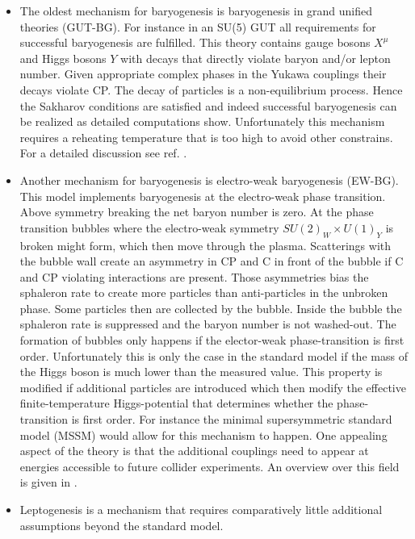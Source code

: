 \documentclass[13pt,a4paper,titlepage]{article}
\begin{document}
\begin{itemize}
    \item The oldest mechanism for baryogenesis is baryogenesis in grand unified theories (GUT-BG).
    For instance in an SU(5) GUT all requirements for successful baryogenesis are
    fulfilled. This theory contains gauge bosons $X^\mu$ and Higgs bosons $Y$ with decays that directly
    violate baryon and/or lepton number. Given appropriate complex phases in the Yukawa couplings
    their decays violate CP. The decay of particles is a non-equilibrium process. Hence the Sakharov conditions are satisfied and indeed successful baryogenesis can be realized as detailed computations show.
    Unfortunately this mechanism requires a reheating temperature that is too high to avoid other constrains. For a detailed discussion see ref. \cite[sec. 3]{Dine_2003_Bayrogenesis}.
    \item Another mechanism for baryogenesis is electro-weak baryogenesis (EW-BG).
    This model implements baryogenesis at the electro-weak phase transition.
    Above symmetry breaking the net baryon number is zero.
    At the phase transition bubbles where the electro-weak symmetry $SU(2)_W \times U(1)_Y$ is broken might form, which then
    move through the plasma.
    Scatterings with the bubble wall create an asymmetry in CP and C in front of the bubble if C and CP violating interactions are present.
    Those asymmetries bias the sphaleron rate to create more particles than anti-particles in the unbroken phase.
    Some particles then are collected by the bubble. Inside the bubble the sphaleron rate is suppressed and the
    baryon number is not washed-out.
    The formation of bubbles only happens if the elector-weak phase-transition is first order.
    Unfortunately this is only the case in the standard model if the mass of the Higgs boson is much lower than
    the measured value.
    This property is modified if additional particles are introduced which then modify the effective finite-temperature
    Higgs-potential that determines whether the phase-transition is first order.
    For instance the minimal supersymmetric standard model (MSSM) would allow for this mechanism to happen.
    One appealing aspect of the theory is that the additional couplings need to appear at energies accessible to future collider
    experiments. An overview over this field is given in \cite{Electroweak_baryogenesis_Morrissey_2012}.
    \item Leptogenesis is a mechanism that requires comparatively little additional assumptions beyond the standard model.

\end{itemize}
\end{document}
